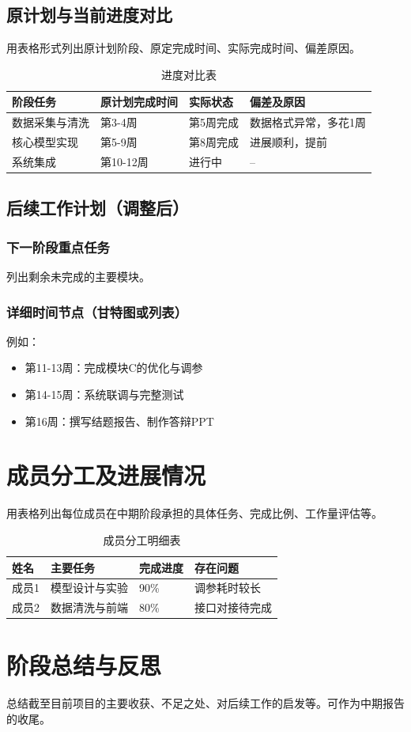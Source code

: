 \documentclass{style/course-report}
\begin{document}
\subsection{原计划与当前进度对比}
用表格形式列出原计划阶段、原定完成时间、实际完成时间、偏差原因。

\begin{table}[H]
    \centering
    \caption{进度对比表}
    \begin{tabular}{llll}
        \toprule
        阶段任务 & 原计划完成时间 & 实际状态 & 偏差及原因 \\
        \midrule
        数据采集与清洗 & 第3-4周 & 第5周完成 & 数据格式异常，多花1周 \\
        核心模型实现 & 第5-9周 & 第8周完成 & 进展顺利，提前 \\
        系统集成 & 第10-12周 & 进行中 & -- \\
        \bottomrule
    \end{tabular}
\end{table}

\subsection{后续工作计划（调整后）}
\subsubsection{下一阶段重点任务}
列出剩余未完成的主要模块。

\subsubsection{详细时间节点（甘特图或列表）}
例如：
\begin{itemize}
    \item 第11-13周：完成模块C的优化与调参
    \item 第14-15周：系统联调与完整测试
    \item 第16周：撰写结题报告、制作答辩PPT
\end{itemize}


\section{成员分工及进展情况}
用表格列出每位成员在中期阶段承担的具体任务、完成比例、工作量评估等。

\begin{table}[H]
    \centering
    \caption{成员分工明细表}
    \begin{tabular}{llll}
        \toprule
        姓名 & 主要任务 & 完成进度 & 存在问题 \\
        \midrule
        成员1 & 模型设计与实验 & 90\% & 调参耗时较长 \\
        成员2 & 数据清洗与前端 & 80\% & 接口对接待完成 \\
        \bottomrule
    \end{tabular}
\end{table}

\section{阶段总结与反思}
总结截至目前项目的主要收获、不足之处、对后续工作的启发等。可作为中期报告的收尾。

 

\end{document}
